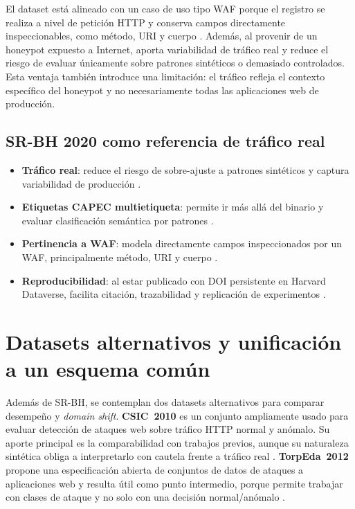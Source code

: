\documentclass[12pt,oneside]{report}
\begin{document}
El dataset está alineado con un caso de uso tipo WAF porque el registro se realiza a nivel de petición HTTP y conserva campos directamente inspeccionables, como método, URI y cuerpo \cite{srbh_paper,owasp_waf}. Además, al provenir de un honeypot expuesto a Internet, aporta variabilidad de tráfico real y reduce el riesgo de evaluar únicamente sobre patrones sintéticos o demasiado controlados. Esta ventaja también introduce una limitación: el tráfico refleja el contexto específico del honeypot y no necesariamente todas las aplicaciones web de producción.

\subsection{SR-BH 2020 como referencia de tráfico real}
\begin{itemize}[leftmargin=*]
  \item \textbf{Tráfico real}: reduce el riesgo de sobre-ajuste a patrones sintéticos y captura variabilidad de producción \cite{srbh_paper}.
  \item \textbf{Etiquetas CAPEC multietiqueta}: permite ir más allá del binario y evaluar clasificación semántica por patrones \cite{srbh_paper,capec_about}.
  \item \textbf{Pertinencia a WAF}: modela directamente campos inspeccionados por un WAF, principalmente método, URI y cuerpo \cite{owasp_waf,modsecurity_site}.
  \item \textbf{Reproducibilidad}: al estar publicado con DOI persistente en Harvard Dataverse, facilita citación, trazabilidad y replicación de experimentos \cite{srbh_dataverse}.
\end{itemize}

\section{Datasets alternativos y unificación a un esquema común}
Además de SR-BH, se contemplan dos datasets alternativos para comparar desempeño y \textit{domain shift}. \textbf{CSIC~2010} es un conjunto ampliamente usado para evaluar detección de ataques web sobre tráfico HTTP normal y anómalo. Su aporte principal es la comparabilidad con trabajos previos, aunque su naturaleza sintética obliga a interpretarlo con cautela frente a tráfico real \cite{csic2010_impact,csic2010_doc}. \textbf{TorpEda~2012} propone una especificación abierta de conjuntos de datos de ataques a aplicaciones web y resulta útil como punto intermedio, porque permite trabajar con clases de ataque y no solo con una decisión normal/anómalo \cite{torpeda_2012}.
\end{document}
